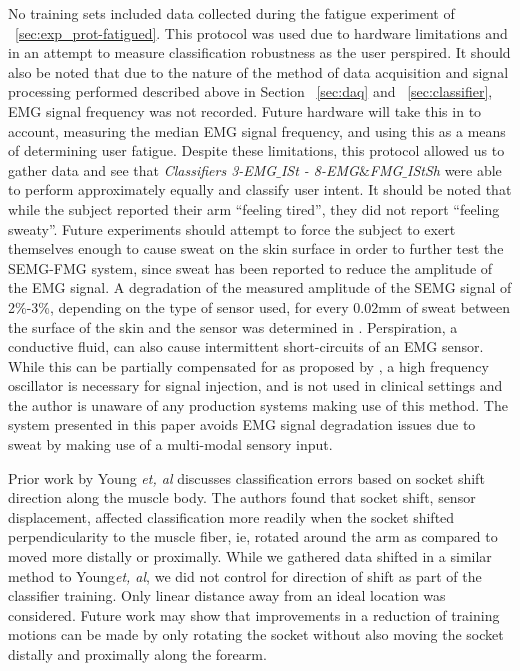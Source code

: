 \documentclass[twocolumn]{sagej}
\begin{document}
No training sets included data collected during the fatigue experiment of ~\ref{sec:exp_prot-fatigued}.  This protocol was used due to hardware limitations and in an attempt to measure classification robustness as the user perspired.  It should also be noted that due to the nature of the method of data acquisition and signal processing performed described above in Section ~\ref{sec:daq} and ~\ref{sec:classifier}, EMG signal frequency was not recorded. Future hardware will take this in to account, measuring the median EMG signal frequency, and using this as a means of determining user fatigue.  Despite these limitations, this protocol allowed us to gather data and see that \textit{Classifiers 3-EMG$\_$ISt - 8-EMG$\&$FMG$\_$IStSh} were able to perform approximately equally and classify user intent. It should be noted that while the subject reported their arm ``feeling tired'', they did not report ``feeling sweaty''.  Future experiments should attempt to force the subject to exert themselves  enough to cause sweat on the skin surface in order to further test the SEMG-FMG system, since sweat has been reported to reduce the amplitude of the EMG signal.  A degradation of the measured amplitude of the SEMG signal of 2\%-3\%, depending on the type of sensor used, for every 0.02mm of sweat between the surface of the skin and the sensor was determined in \cite{Abdoli-Eramaki2012}.  Perspiration, a conductive fluid, can also cause intermittent short-circuits of an EMG sensor.  While this can be partially compensated for as proposed by \cite{Ray1983}, a high frequency oscillator is necessary for signal injection, and is not used in clinical settings and the author is unaware of any production systems making use of this method.  The system presented in this paper avoids EMG signal degradation issues due to sweat by making use of a multi-modal sensory input. \par \noindent 
Prior work by Young \textit{et, al} discusses classification errors based on socket shift direction along the muscle body\cite{Young2011}.  The authors found that socket shift, sensor displacement, affected classification more readily when the socket shifted perpendicularity to the muscle fiber, ie, rotated around the arm as compared to moved more distally or proximally.  While we gathered data shifted in a similar method to Young\textit{et, al}, we did not control for direction of shift as part of the classifier training. Only linear distance away from an ideal location was considered. Future work may show that improvements in a reduction of training motions can be made by only rotating the socket without also moving the socket distally and proximally along the forearm.  \par \noindent 
\end{document}
